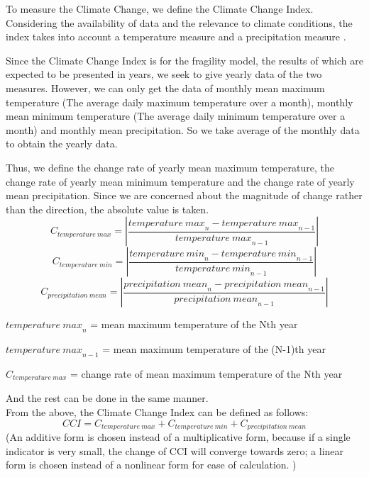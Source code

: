 \documentclass[a4paper,12pt]{article}
\begin{document}
To measure the Climate Change, we define the Climate Change Index. Considering the availability of data and the relevance to climate conditions, the index takes into account a temperature measure and a precipitation measure \citep{alexander2006global}.

 Since the Climate Change Index is for the fragility model, the results of which are expected to be presented in years, we seek to give yearly data of the two measures. However, we can only get the data of monthly mean maximum temperature (The average daily maximum temperature over a month), monthly mean minimum temperature (The average daily minimum temperature over a month) and monthly mean precipitation. So we take average of the monthly data to obtain the yearly data.

 Thus, we define the change rate of yearly mean maximum temperature, the change rate of yearly mean minimum temperature and the change rate of yearly mean precipitation. Since we are concerned about the magnitude of change rather than the direction, the absolute value is taken.
\begin{equation}
\label{eq1}
C_{temperature~max}=\left|\frac{{temperature~max}_n-{temperature~max}_{n-1}}{{temperature~max}_{n-1}}\right|
\end{equation}
\begin{equation}
\label{eq2}
C_{temperature~min}=\left|\frac{{temperature~min}_n-{temperature~min}_{n-1}}{{temperature~min}_{n-1}}\right|
\end{equation}
\begin{equation}
\label{eq3}
C_{precipitation~mean}=\left|\frac{{precipitation~mean}_n-{precipitation~mean}_{n-1}}{{precipitation~mean}_{n-1}}\right|
\end{equation}

\qquad${temperature~max}_n$ = mean maximum temperature of the Nth year

\qquad${temperature~max}_{n-1}$ = mean maximum temperature of the (N-1)th year

\qquad$C_{temperature~max}$ = change rate of mean maximum temperature of the Nth year

\qquad And the rest can be done in the same manner.
\\


From the above, the Climate Change Index can be defined as follows:
\begin{equation}
\label{eq4}
CCI=C_{temperature~max}+	C_{temperature~min}+C_{precipitation~mean}
\end{equation}
(An additive form is chosen instead of a multiplicative form, because if a single indicator is very small, the change of CCI will converge towards zero; a linear form is chosen instead of a nonlinear form for ease of calculation. )
\end{document}
